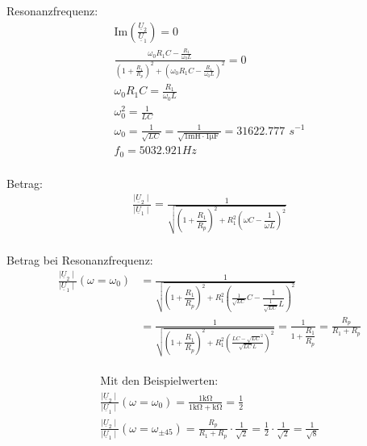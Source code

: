 \documentclass[a4paper, 12pt]{article}
\begin{document}
  Resonanzfrequenz:
    \begin{gather*}
      \text{Im}\left( \frac{ \underline{U}_2 }{ \underline{U}_1 } \right) = 0\\
      \frac{\omega_0 R_1 C - \frac{R_1}{\omega_0 L}}{\left( 1+\frac{R_1}{R_p} \right)^2 + \left( \omega_0 R_1 C - \frac{R_1}{\omega_0 L}\right)^2} = 0\\
      \omega_0 R_1 C = \frac{R_1}{\omega_0 L}\\
      \omega_0^2 = \frac{1}{LC}\\
      \omega_0 = \frac{1}{\sqrt{LC}} = \frac{1}{\sqrt{1 \si{\milli\henry} \cdot 1 \si{\micro\farad}}}=31622.777 \,\ \si{s}^{-1}\\
      f_0 = 5032.921 \si{Hz}\\
    \end{gather*}

  Betrag:
    \begin{gather*}
      \frac{\mid \underline{U}_2 \mid}{\mid \underline{U}_1 \mid} = \frac{1}{  \sqrt{ \left( 1+ \dfrac{R_1}{R_p} \right)^2  + R_1^2 \left( \omega C - \dfrac{1}{\omega L} \right)^2}}\\
    \end{gather*}

  Betrag bei Resonanzfrequenz:
    \begin{align*}
      \frac{\mid \underline{U}_2 \mid}{\mid \underline{U}_1 \mid} \left( \omega = \omega_0 \right) &= \frac{1}{ \sqrt{ \left( 1+ \dfrac{R_1}{R_p} \right)^2  + R_1^2 \left( \frac{1}{\sqrt{LC}} C - \dfrac{1}{\frac{1}{\sqrt{LC}} L} \right)^2}}\\
      &= \frac{1}{ \sqrt{ \left( 1+ \dfrac{R_1}{R_p} \right)^2  + R_1^2 \left( \frac{LC-\sqrt{LC}^2}{\sqrt{LC}L} \right)^2}} = \frac{1}{1+\dfrac{R_1}{R_p}} = \frac{R_p}{R_1+R_p}\\
    \end{align*}

    \begin{gather*}
      \text{Mit den Beispielwerten:}\\
      \frac{\mid \underline{U}_2 \mid}{\mid \underline{U}_1 \mid} \left( \omega = \omega_0 \right) = \frac{1 \si{\kilo\ohm}}{1 \si{\kilo\ohm} + \si{\kilo\ohm}} = \frac{1}{2}\\
      \frac{\mid \underline{U}_2 \mid}{\mid \underline{U}_1 \mid} \left( \omega = \omega_{\pm 45} \right) = \frac{R_p}{R_1+R_p} \cdot \frac{1}{\sqrt{2}} = \frac{1}{2} \cdot \frac{1}{\sqrt{2}} = \frac{1}{\sqrt{8}}
    \end{gather*}
\end{document}
